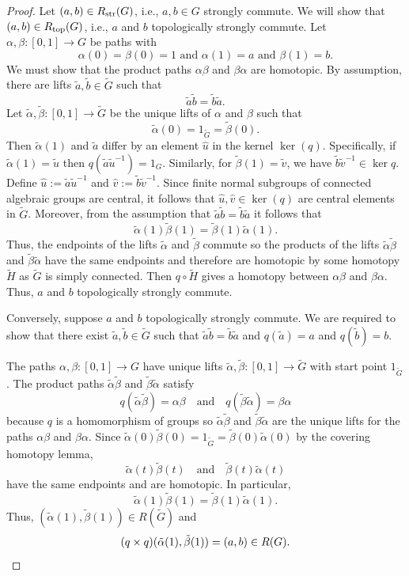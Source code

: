 \documentclass[12pt, a4paper, oneside]{amsart}
\theoremstyle{plain} %
\theoremstyle{definition} %
\theoremstyle{remark} %
\begin{document}
\begin{proof}
Let $(a,b)\in R_{\rm str}(G)$, i.e., $a,b\in G$ strongly commute.  We will show that $(a,b)\in R_{\rm top}(G)$, i.e., $a$ and $b$ topologically strongly commute. Let $\alpha,\beta: [0,1]\to G$ be paths with 
\[
\alpha(0)=\beta(0)=1\,\, \text{and}\,\,
 \alpha(1)=a\,\, \text{and}\,\, \beta(1)=b.
\]
We must show that the product paths $\alpha\beta$ and $\beta\alpha$ are homotopic. By assumption, there are lifts $\tilde{a},\tilde{b}\in \tilde{G}$ such that
\[\tilde{a}\tilde{b} = \tilde{b}\tilde{a}.\]
Let $\tilde{\alpha},\tilde{\beta}:[0,1]\to \tilde{G}$ be the unique lifts of $\alpha$ and $\beta$ such that 
\[\tilde{\alpha}(0)=1_{\tilde{G}}=\tilde{\beta}(0).\]
Then $\tilde{\alpha}(1)$ and $\tilde{a}$ differ by an element $\hat{u} $ in the kernel $\ker(q) $. Specifically, if $\tilde{\alpha}(1)=\tilde{u}$ then $q(\tilde{a}\tilde{u}^{-1})= 1_G$. Similarly, for $\tilde{\beta}(1)=\tilde{v}$, we have $\tilde{b}\tilde{v}^{-1}\in\ker q$. Define $\hat{u}:=\tilde{a}\tilde{u}^{-1}$ and $\hat{v}:=\tilde{b}\tilde{v}^{-1}$. Since finite normal subgroups of connected algebraic groups are central, it follows that $\hat{u},\hat{v}\in \ker(q)$ are central elements in $\tilde{G}$. Moreover, from the assumption that $\tilde{a}\tilde{b}=\tilde{b}\tilde{a}$ it follows that
\[\tilde{\alpha}(1)\tilde{\beta}(1) = \tilde{\beta}(1)\tilde{\alpha}(1).\]
Thus, the endpoints of the lifts $\tilde{\alpha}$ and $\tilde{\beta}$ commute so the products of the lifts $\tilde{\alpha}\tilde{\beta}$ and $\tilde{\beta}\tilde{\alpha}$
have the same endpoints and therefore are homotopic by some homotopy $\tilde{H}$ as $\tilde{G}$ is simply connected. Then $q\circ \tilde{H}$ gives a homotopy between $\alpha\beta$ and $\beta\alpha$. Thus, $a$ and $b$ topologically strongly commute.

Conversely, suppose $a$ and $b$ topologically strongly commute. We are required to show that there exist $\tilde{a},\tilde{b}\in \tilde{G}$ such that $\tilde{a}\tilde{b} = \tilde{b}\tilde{a}$ and $q(\tilde{a})=a$ and $q(\tilde{b})=b$. 

The paths $\alpha,\beta:[0,1]\to G$ have unique lifts $\tilde{\alpha},\tilde{\beta}:[0,1]\to \tilde{G}$ with start point $1_{\tilde{G}}$. The product paths $\tilde{\alpha}\tilde{\beta}$ and $\tilde{\beta}\tilde{\alpha}$ satisfy
\[q(\tilde{\alpha}\tilde{\beta}) = \alpha\beta\quad \text{and}\quad q(\tilde{\beta}\tilde{\alpha})=\beta\alpha\]
because $q$ is a homomorphism of groups so $\tilde{\alpha}\tilde{\beta}$ and $\tilde{\beta}\tilde{\alpha}$ are the unique lifts for the paths $\alpha\beta$ and $\beta\alpha$. Since $\tilde{\alpha}(0)\tilde{\beta}(0)=1_{\tilde{G}} = \tilde{\beta}(0)\tilde{\alpha}(0)$ by the covering homotopy lemma, 
\[\tilde{\alpha}(t)\tilde{\beta}(t) \quad \text{and} \quad \tilde{\beta}(t)\tilde{\alpha}(t)\]
have the same endpoints and are homotopic.  In particular, 
\[\tilde{\alpha}(1)\tilde{\beta}(1)=\tilde{\beta}(1)\tilde{\alpha}(1).\]
Thus, $(\tilde{\alpha}(1),\tilde{\beta}(1))\in R(\tilde{G})$ and 
\[(q\times q)(\tilde{\alpha}(1),\tilde{\beta}(1))=(a,b)\in R(G).\qedhere\] 
\end{proof}
\end{document}
